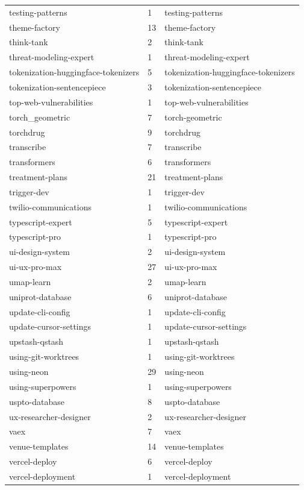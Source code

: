 \begin{longtable}{@{}lll@{}}
testing-patterns & 1 & testing-patterns\\
theme-factory & 13 & theme-factory\\
think-tank & 2 & think-tank\\
threat-modeling-expert & 1 & threat-modeling-expert\\
tokenization-huggingface-tokenizers & 5 & tokenization-huggingface-tokenizers\\
tokenization-sentencepiece & 3 & tokenization-sentencepiece\\
top-web-vulnerabilities & 1 & top-web-vulnerabilities\\
torch\_geometric & 7 & torch-geometric\\
torchdrug & 9 & torchdrug\\
transcribe & 7 & transcribe\\
transformers & 6 & transformers\\
treatment-plans & 21 & treatment-plans\\
trigger-dev & 1 & trigger-dev\\
twilio-communications & 1 & twilio-communications\\
typescript-expert & 5 & typescript-expert\\
typescript-pro & 1 & typescript-pro\\
ui-design-system & 2 & ui-design-system\\
ui-ux-pro-max & 27 & ui-ux-pro-max\\
umap-learn & 2 & umap-learn\\
uniprot-database & 6 & uniprot-database\\
update-cli-config & 1 & update-cli-config\\
update-cursor-settings & 1 & update-cursor-settings\\
upstash-qstash & 1 & upstash-qstash\\
using-git-worktrees & 1 & using-git-worktrees\\
using-neon & 29 & using-neon\\
using-superpowers & 1 & using-superpowers\\
uspto-database & 8 & uspto-database\\
ux-researcher-designer & 2 & ux-researcher-designer\\
vaex & 7 & vaex\\
venue-templates & 14 & venue-templates\\
vercel-deploy & 6 & vercel-deploy\\
vercel-deployment & 1 & vercel-deployment\\

\end{longtable}
